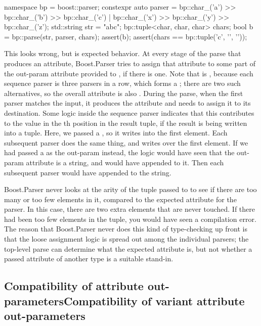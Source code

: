 \documentclass{MyBook}
\begin{document}
\begin{code}
namespace bp = boost::parser;
constexpr auto parser = bp::char_('a') >> bp::char_('b') >> bp::char_('c') |
                        bp::char_('x') >> bp::char_('y') >> bp::char_('z');
std::string str = "abc";
bp::tuple<char, char, char> chars;
bool b = bp::parse(str, parser, chars);
assert(b);
assert(chars == bp::tuple('c', '\0', '\0'));
\end{code}

This looks wrong, but is expected behavior. At every stage of the parse that produces an attribute, Boost.Parser tries to assign that attribute to some part of the out-param attribute provided to , if there is one. Note that \emph{} is , because each sequence parser is three  parsers in a row, which forms a ; there are two such alternatives, so the overall attribute is also . During the parse, when the first parser  matches the input, it produces the attribute  and needs to assign it to its destination. Some logic inside the sequence parser indicates that this  contributes to the value in the th position in the result tuple, if the result is being written into a tuple. Here, we passed a , so it writes  into the first element. Each subsequent  parser does the same thing, and writes over the first element. If we had passed a  as the out-param instead, the logic would have seen that the out-param attribute is a string, and would have appended  to it. Then each subsequent parser would have appended to the string.

Boost.Parser never looks at the arity of the tuple passed to  to see if there are too many or too few elements in it, compared to the expected attribute for the parser. In this case, there are two extra elements that are never touched. If there had been too few elements in the tuple, you would have seen a compilation error. The reason that Boost.Parser never does this kind of type-checking up front is that the loose assignment logic is spread out among the individual parsers; the top-level parse can determine what the expected attribute is, but not whether a passed attribute of another type is a suitable stand-in.

\subsection{{Compatibility of  attribute out-parameters}{Compatibility of variant attribute out-parameters}}
\end{document}

